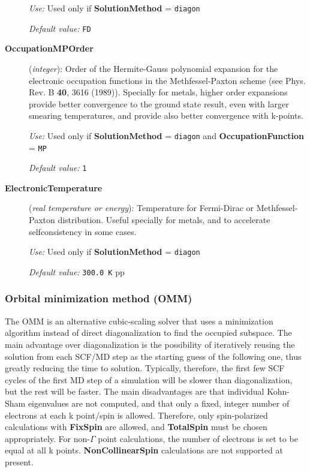 \documentclass[11pt]{article}
\begin{document}
\begin{description}
{\it Use:} Used only if {\bf SolutionMethod} = {\tt diagon}

{\it Default value:} {\tt FD}

\item[{\bf OccupationMPOrder}]({\it integer}):
Order of the Hermite-Gauss polynomial expansion for the
electronic occupation functions in the Methfessel-Paxton
scheme (see Phys. Rev. B  {\bf 40}, 3616 (1989)).
Specially for metals, higher order expansions provide better convergence
to the ground state result, even with larger smearing
temperatures, and provide also better convergence with k-points.


{\it Use:} Used only if {\bf SolutionMethod} = {\tt diagon}
and {\bf OccupationFunction} =  {\tt MP}

{\it Default value:} {\tt 1}



\item[{\bf ElectronicTemperature}] ({\it real temperature or energy}):
Temperature for Fermi-Dirac or Methfessel-Paxton
distribution. Useful specially for
metals, and to accelerate selfconsistency in some cases.

{\it Use:} Used only if {\bf SolutionMethod} = {\tt diagon}

{\it Default value:} {\tt 300.0 K}
pp

\end{description}

\subsubsection{Orbital minimization method (OMM)} \label{SolverOMM}

The OMM is an alternative cubic-scaling solver that uses a minimization
algorithm instead of direct diagonalization to find the occupied subspace.
The main advantage over diagonalization is the possibility of iteratively
reusing the solution from each SCF/MD step as the starting guess of the
following one, thus greatly reducing the time to solution. Typically,
therefore, the first few SCF cycles of the first MD step of a simulation
will be slower than diagonalization, but the rest will be faster. The main
disadvantages are that individual Kohn-Sham eigenvalues are not computed,
and that only a fixed, integer number of electrons at each k point/spin is
allowed. Therefore, only spin-polarized calculations with {\bf FixSpin}
are allowed, and {\bf TotalSpin} must be chosen appropriately. For
non-$\Gamma$ point calculations, the number of electrons is set to be equal
at all k points. {\bf NonCollinearSpin} calculations are not supported at
present.
\end{document}

